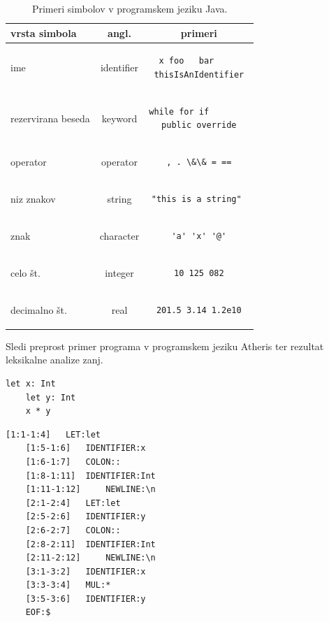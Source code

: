 \documentclass[a4paper, 12p]{book}
\begin{document}
\begin{table}
	\begin{center}
		\begin{tabular}{l|c|c}
			\textbf{vrsta simbola} & \textbf{angl.} & \textbf{primeri} \\ \hline\hline
			ime & identifier & 
\begin{lstlisting} 
x foo	bar		
thisIsAnIdentifier
\end{lstlisting} \\
			rezervirana beseda & keyword & 
\begin{lstlisting} 
while for if		
public override
\end{lstlisting} \\
			operator & operator & 
\begin{lstlisting} 
, . \&\& = ==
\end{lstlisting} \\
			niz znakov & string & 
\begin{lstlisting} 
"this is a string" 
\end{lstlisting} \\
			znak & character &
\begin{lstlisting} 
'a' 'x' '@'
\end{lstlisting} \\
			celo št. & integer &
\begin{lstlisting} 
10 125 082
\end{lstlisting} \\
			decimalno št. & real &
\begin{lstlisting} 
201.5 3.14 1.2e10
\end{lstlisting} \\
		\end{tabular}
	\end{center}
	\caption{Primeri simbolov v programskem jeziku Java.}
	\label{tabel:vrsteZetonov}
\end{table}

Sledi preprost primer programa v programskem jeziku Atheris ter rezultat leksikalne analize zanj.

\renewcommand{\lstlistingname}{Program}
\begin{lstlisting}[caption={Primer programa v programskem jeziku Atheris.},label={lst:atherisCode}, captionpos=b]
	let x: Int
	let y: Int
	x * y
\end{lstlisting}

\renewcommand{\lstlistingname}{Izpis}
\begin{lstlisting}[caption={Rezultat leksikalne analize za program ~\ref{lst:atherisCode}.},label={lst:lexedSource},captionpos=b]
	[1:1-1:4] 	LET:let
	[1:5-1:6] 	IDENTIFIER:x
	[1:6-1:7] 	COLON::
	[1:8-1:11] 	IDENTIFIER:Int
	[1:11-1:12] 	NEWLINE:\n
	[2:1-2:4] 	LET:let
	[2:5-2:6] 	IDENTIFIER:y
	[2:6-2:7] 	COLON::
	[2:8-2:11] 	IDENTIFIER:Int
	[2:11-2:12] 	NEWLINE:\n
	[3:1-3:2] 	IDENTIFIER:x
	[3:3-3:4] 	MUL:*
	[3:5-3:6] 	IDENTIFIER:y
	EOF:$
\end{lstlisting}
\end{document}
